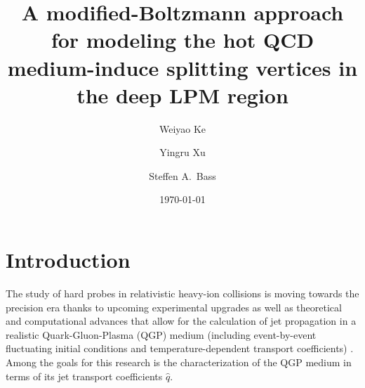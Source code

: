 \documentclass[aps, prc, reprint, amsmath, groupedaddress, nofootinbib]{revtex4-1}
\begin{document}
\title{A modified-Boltzmann approach for modeling the hot QCD medium-induce splitting vertices in the deep LPM region}
\author{Weiyao Ke}
\author{Yingru Xu}
\author{Steffen A.\ Bass}
\date{\today}
\maketitle 

\section{Introduction}
The study of hard probes in relativistic heavy-ion collisions is moving towards the precision era thanks to upcoming experimental upgrades \cite{ATLAS-Collaboration:2012iwa,Abelevetal:2014dna,STAR:upgrade-hf,Adare:2015kwa,CMS:2017dec} as well as theoretical and computational advances that allow for the calculation of jet propagation in a realistic Quark-Gluon-Plasma (QGP) medium (including event-by-event fluctuating initial conditions and temperature-dependent transport coefficients) \cite{Wang:1994fx,Zakharov:1996fv,Baier:1996sk,Zakharov:1997uu,Arnold:2002zm,Gyulassy:2003mc,Kovner:2003zj,Jeon:2003gi,CasalderreySolana:2007pr,Djordjevic:2008iz,Bass:2008rv,Schenke:2009gb,Majumder:2009zu,Majumder:2010qh,Armesto:2011ht,Zapp:2011ya,Ovanesyan:2011xy,Kang:2014xsa,Cao:2016gvr,Kauder:2018cdt,Cao:2017zih}. Among the goals for this research is the characterization of the QGP medium in terms of its jet transport coefficients $\hat{q}$.
\end{document}
